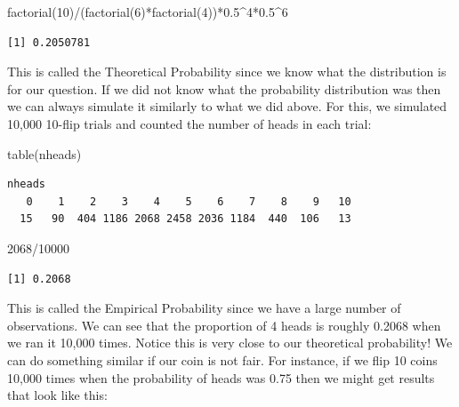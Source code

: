\documentclass[
  letterpaper,
  DIV=11,
  numbers=noendperiod]{scrreprt}
\newenvironment{Shaded}{\begin{snugshade}}{\end{snugshade}}
\newcommand{\DecValTok}[1]{\textcolor[rgb]{0.68,0.00,0.00}{#1}}
\newcommand{\FloatTok}[1]{\textcolor[rgb]{0.68,0.00,0.00}{#1}}
\newcommand{\FunctionTok}[1]{\textcolor[rgb]{0.28,0.35,0.67}{#1}}
\newcommand{\NormalTok}[1]{\textcolor[rgb]{0.00,0.23,0.31}{#1}}
\newcommand{\SpecialCharTok}[1]{\textcolor[rgb]{0.37,0.37,0.37}{#1}}
\begin{document}
\begin{Shaded}
\begin{Highlighting}[]
\FunctionTok{factorial}\NormalTok{(}\DecValTok{10}\NormalTok{)}\SpecialCharTok{/}\NormalTok{(}\FunctionTok{factorial}\NormalTok{(}\DecValTok{6}\NormalTok{)}\SpecialCharTok{*}\FunctionTok{factorial}\NormalTok{(}\DecValTok{4}\NormalTok{))}\SpecialCharTok{*}\FloatTok{0.5}\SpecialCharTok{\^{}}\DecValTok{4}\SpecialCharTok{*}\FloatTok{0.5}\SpecialCharTok{\^{}}\DecValTok{6}
\end{Highlighting}
\end{Shaded}

\begin{verbatim}
[1] 0.2050781
\end{verbatim}

This is called the Theoretical Probability since we know what the
distribution is for our question. If we did not know what the
probability distribution was then we can always simulate it similarly to
what we did above. For this, we simulated 10,000 10-flip trials and
counted the number of heads in each trial:

\begin{Shaded}
\begin{Highlighting}[]
\FunctionTok{table}\NormalTok{(nheads)}
\end{Highlighting}
\end{Shaded}

\begin{verbatim}
nheads
   0    1    2    3    4    5    6    7    8    9   10 
  15   90  404 1186 2068 2458 2036 1184  440  106   13 
\end{verbatim}

\begin{Shaded}
\begin{Highlighting}[]
\DecValTok{2068}\SpecialCharTok{/}\DecValTok{10000}
\end{Highlighting}
\end{Shaded}

\begin{verbatim}
[1] 0.2068
\end{verbatim}

This is called the Empirical Probability since we have a large number of
observations. We can see that the proportion of 4 heads is roughly
0.2068 when we ran it 10,000 times. Notice this is very close to our
theoretical probability! We can do something similar if our coin is not
fair. For instance, if we flip 10 coins 10,000 times when the
probability of heads was 0.75 then we might get results that look like
this:
\end{document}

